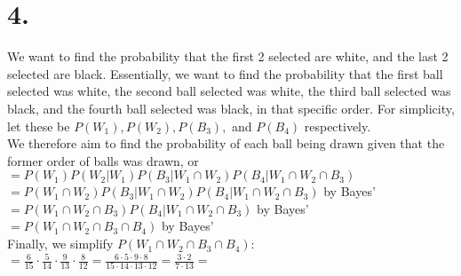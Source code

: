 \documentclass{article}
\begin{document}
\section*{4.}
{\Large 

We want to find the probability that the first 2 selected are white, and the last 2 selected are black. Essentially, we want to find the probability that the first ball selected was white, the second ball selected was white, the third ball selected was black, and the fourth ball selected was black, in that specific order. For simplicity, let these be $P(W_1), P(W_2), P(B_3), $ and $P(B_4)$ respectively. \\
We therefore aim to find the probability of each ball being drawn given that the former order of balls was drawn, or \\ 
$= P(W_1)P(W_2 | W_1)P(B_3 | W_1 \cap W_2)P(B_4 | W_1 \cap W_2 \cap B_3) $ \\
$= P(W_1 \cap W_2)P(B_3 | W_1 \cap W_2)P(B_4 | W_1 \cap W_2 \cap B_3) $ by Bayes' \\ 
$= P(W_1 \cap W_2 \cap B_3)P(B_4 | W_1 \cap W_2 \cap B_3) $ by Bayes' \\ 
$= P(W_1 \cap W_2 \cap B_3 \cap B_4)$ by Bayes' \\ 
Finally, we simplify $P(W_1 \cap W_2 \cap B_3 \cap B_4)$: \\
$=\frac{6}{15} \cdot \frac{5}{14} \cdot \frac{9}{13} \cdot \frac{8}{12} = \frac{6 \cdot 5 \cdot 9 \cdot 8}{15 \cdot 14 \cdot 13 \cdot 12} = \frac{3 \cdot 2}{7 \cdot 13} = $ 


}
\end{document}
